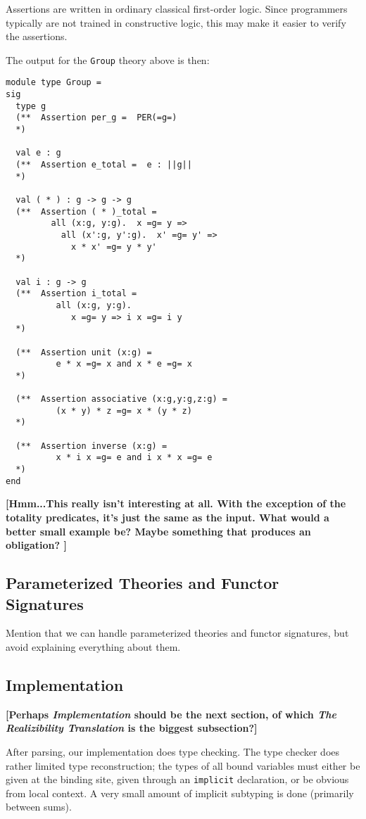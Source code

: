 \documentclass{article}
\newcommand{\comment}[1]{\textbf{[#1]}}
\begin{document}
Assertions are written in ordinary classical first-order logic. Since
programmers typically are not trained in constructive logic, this
may make it easier to verify the assertions.

The output for the \Verb|Group| theory above is then:
\begin{Verbatim}
module type Group = 
sig
  type g
  (**  Assertion per_g =  PER(=g=)
  *)
   
  val e : g
  (**  Assertion e_total =  e : ||g||
  *)
   
  val ( * ) : g -> g -> g
  (**  Assertion ( * )_total =
         all (x:g, y:g).  x =g= y =>
           all (x':g, y':g).  x' =g= y' => 
             x * x' =g= y * y'
  *)
   
  val i : g -> g
  (**  Assertion i_total =  
          all (x:g, y:g).  
             x =g= y => i x =g= i y
  *)
   
  (**  Assertion unit (x:g) =  
          e * x =g= x and x * e =g= x
  *)
   
  (**  Assertion associative (x:g,y:g,z:g) =  
          (x * y) * z =g= x * (y * z)
  *)
   
  (**  Assertion inverse (x:g) =  
          x * i x =g= e and i x * x =g= e
  *)
end
\end{Verbatim}
\comment{Hmm...This really isn't interesting at all.  With the
  exception of the totality predicates, it's just the same as the
  input.  What would a better small example be?  Maybe something
  that produces an obligation?
  }

\subsection{Parameterized Theories and Functor Signatures}
\label{sec:param-theor-funct}


Mention that we can handle parameterized theories and functor
signatures, but avoid explaining everything about them.

\subsection{Implementation}

\comment{Perhaps \emph{Implementation} should be the next section, of which
\emph{The Realizibility Translation} is the biggest subsection?}

After parsing, our implementation does type checking.  The type
checker does rather limited type reconstruction; the types of all
bound variables must either be given at the binding site, given
through an \Verb|implicit| declaration, or be obvious from local
context.  A very small amount of implicit subtyping is done (primarily
between sums).  
\end{document}
